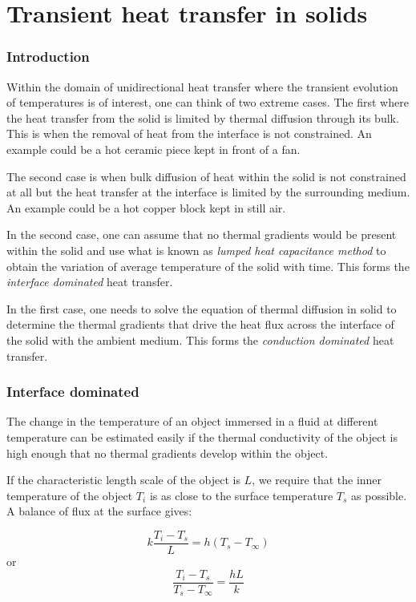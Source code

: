\chapter{Transient heat transfer in solids}
\label{ch:heatcases2}

\subsection{Introduction}
Within the domain of unidirectional heat transfer where the transient evolution
of temperatures is of interest, one can think of two extreme cases. The first
where the heat transfer from the solid is limited by thermal diffusion through
its bulk. This is when the removal of heat from the interface is not
constrained. An example could be a hot ceramic piece kept in front of a fan. 


The second case is when bulk diffusion of heat within the solid is not
constrained at all but the heat transfer at the interface is limited by the
surrounding medium. An example could be a hot copper block kept in still air.


In the second case, one can assume that no thermal gradients would be present
within the solid and use what is known as {\it lumped heat capacitance method}
to obtain the variation of average temperature of the solid with time. This
forms the {\it interface dominated} heat transfer.


In the first case, one needs to solve the equation of thermal diffusion in solid
to determine the thermal gradients that drive the heat flux across the interface
of the solid with the ambient medium. This forms the {\it conduction dominated}
heat transfer.


\subsection{Interface dominated}

The change in the temperature of an object immersed in a fluid at different
temperature can be estimated easily if the thermal conductivity of the object is
high enough that no thermal gradients develop within the object. 

If the characteristic length scale of the object is $L$, we require that the
inner temperature of the object $T_i$ is as close to the surface temperature
$T_s$ as possible. A balance of flux at the surface gives:

$$ k \frac{T_i - T_s}{L} = h \left(T_s - T_\infty\right) $$
or
$$ \frac{T_i - T_s}{T_s - T_\infty} = \frac{hL}{k}$$

